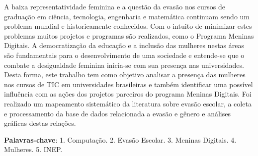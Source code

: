 
\setlength{\absparsep}{18pt} %
\begin{resumo}



A baixa representatividade feminina e a questão da evasão nos cursos de graduação em ciência, tecnologia, engenharia e matemática continuam sendo um problema mundial e historicamente conhecidos. Com o intuito de minimizar estes problemas muitos projetos e programas são realizados, como o Programa Meninas Digitais. A democratização da educação e a inclusão das mulheres nestas áreas são fundamentais para o desenvolvimento de uma sociedade e entende-se que o combate a desigualdade feminina inicia-se com sua presença nas universidades. Desta forma, este trabalho tem como objetivo analisar a presença das mulheres nos cursos de TIC em universidades brasileiras e também identificar uma possível influência com as ações dos projetos parceiros do programa Meninas Digitais. Foi realizado um mapeamento sistemático da literatura sobre evasão escolar, a coleta e processamento da base de dados relacionada a evasão e gênero e análises gráficas destas relações. 

 \textbf{Palavras-chave}: 1. Computação. 2. Evasão Escolar. 3. Meninas Digitais. 4. Mulheres. 5. INEP.
\end{resumo}
